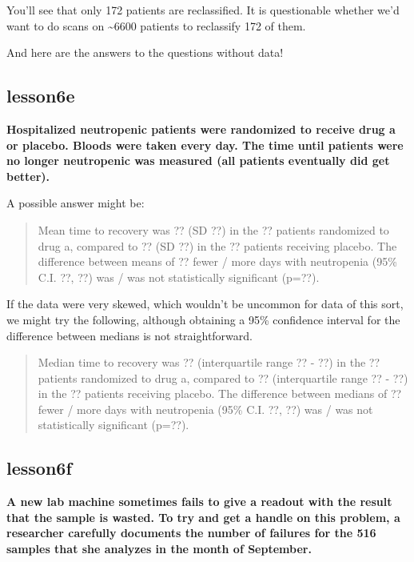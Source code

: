 \documentclass[]{book}
\begin{document}
You'll see that only 172 patients are reclassified. It is questionable whether we'd want to do scans on \textasciitilde6600 patients to reclassify 172 of them.

And here are the answers to the questions without data!

\hypertarget{lesson6e}{%
\subsection{lesson6e}\label{lesson6e}}

\textbf{Hospitalized neutropenic patients were randomized to receive drug a or placebo. Bloods were taken every day. The time until patients were no longer neutropenic was measured (all patients eventually did get better).}

A possible answer might be:

\begin{quote}
Mean time to recovery was ?? (SD ??) in the ?? patients randomized to drug a, compared to ?? (SD ??) in the ?? patients receiving placebo. The difference between means of ?? fewer / more days with neutropenia (95\% C.I. ??, ??) was / was not statistically significant (p=??).
\end{quote}

If the data were very skewed, which wouldn't be uncommon for data of this sort, we might try the following, although obtaining a 95\% confidence interval for the difference between medians is not straightforward.

\begin{quote}
Median time to recovery was ?? (interquartile range ?? - ??) in the ?? patients randomized to drug a, compared to ?? (interquartile range ?? - ??) in the ?? patients receiving placebo. The difference between medians of ?? fewer / more days with neutropenia (95\% C.I. ??, ??) was / was not statistically significant (p=??).
\end{quote}

\hypertarget{lesson6f}{%
\subsection{lesson6f}\label{lesson6f}}

\textbf{A new lab machine sometimes fails to give a readout with the result that the sample is wasted. To try and get a handle on this problem, a researcher carefully documents the number of failures for the 516 samples that she analyzes in the month of September.}
\end{document}

